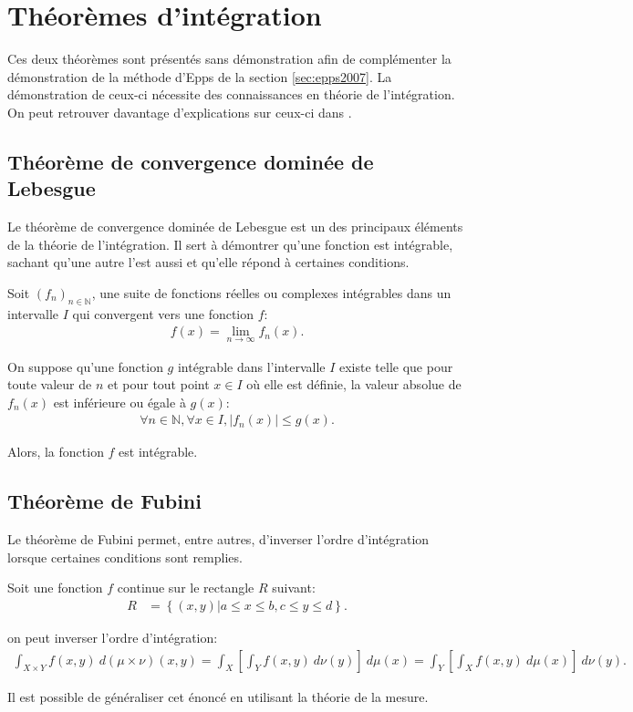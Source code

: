 \section{Théorèmes d'intégration}
\label{sec:integration}

Ces deux théorèmes sont présentés sans démonstration afin de
complémenter la démonstration de la méthode d'Epps de la section
\ref{sec:epps2007}. La démonstration de ceux-ci nécessite des
connaissances en théorie de l'intégration. On peut retrouver davantage
d'explications sur ceux-ci dans \cite{teschl2004topics}.

\subsection{Théorème de convergence dominée de Lebesgue}
\label{sec:theor-de-conv}

Le théorème de convergence dominée de Lebesgue est un des principaux
éléments de la théorie de l'intégration. Il sert à démontrer qu'une
fonction est intégrable, sachant qu'une autre l'est aussi et qu'elle
répond à certaines conditions.

Soit $(f_n)_{n\in \mathbb{N}}$, une suite de fonctions réelles ou
complexes intégrables dans un intervalle $\mathit{I}$ qui convergent
vers une fonction $f$:
\begin{align}
  \label{eq:sequencetheoremconvdom}
  f(x) = \lim_{n \to \infty} f_n(x).
\end{align}

On suppose qu'une fonction $g$ intégrable dans l'intervalle
$\mathit{I}$ existe telle que pour toute valeur de $n$ et pour tout
point $x\in I$ où elle est définie, la valeur absolue de $f_n(x)$ est
inférieure ou égale à $g(x)$:
\begin{align}
  \label{eq:theoremeconvdom}
  \forall n \in \mathbb{N}, \forall x \in \mathit{I}, |f_n(x)| \leq
  g(x).
\end{align}

Alors, la fonction $f$ est intégrable.

\subsection{Théorème de Fubini}
\label{sec:theoreme-de-fubini}

Le théorème de Fubini permet, entre autres, d'inverser l'ordre
d'intégration lorsque certaines conditions sont remplies.

Soit une fonction $f$ continue sur le rectangle $\mathit{R}$ suivant:
\begin{align}
  \label{eq:rectanglefubini}
  \mathit{R} &= \left\{(x,y) | a \leq x \leq b, c \leq y \leq d \right\}.
\end{align}

on peut inverser l'ordre d'intégration:
\begin{align}
  \label{eq:thfubini2}
  \int_{X\times Y}f(x,y)~ d(\mu\times\nu)(x,y)=\int_X\left[\int_Y
    f(x,y)~ d\nu(y)\right]~ d\mu(x)=\int_Y\left[\int_X f(x,y)~
    d\mu(x)\right]~ d\nu(y).
\end{align}

Il est possible de généraliser cet énoncé en utilisant la théorie de
la mesure.
